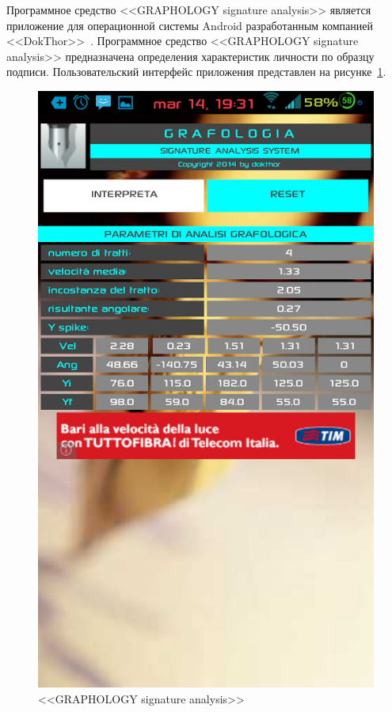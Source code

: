 Программное средство <<GRAPHOLOGY signature analysis>> является приложение для операционной системы Android разработанным компанией <<DokThor>>~\cite{analogs_graphology_sign_analysis}. Программное средство <<GRAPHOLOGY signature analysis>> предназначена определения характеристик личности по образцу подписи. Пользовательский интерфейс приложения представлен на рисунке~\ref{fig:domain:analog:graphology_sign_analysis}.

\begin{figure}[h]
    \centering
    \includegraphics[height=0.5\textheight]{figures/analog_graphology_sign_analysis.png}
    \caption{<<GRAPHOLOGY signature analysis>>}
    \label{fig:domain:analog:graphology_sign_analysis}
\end{figure}

